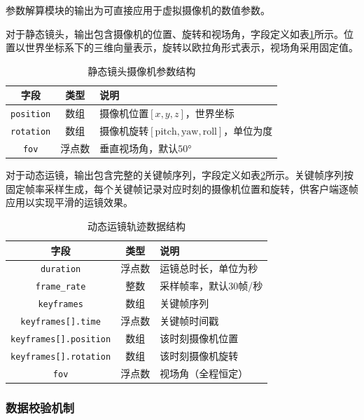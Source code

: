 参数解算模块的输出为可直接应用于虚拟摄像机的数值参数。

对于静态镜头，输出包含摄像机的位置、旋转和视场角，字段定义如表\ref{tab:static_camera}所示。位置以世界坐标系下的三维向量表示，旋转以欧拉角形式表示，视场角采用固定值。

\begin{table}[htbp]
\centering
\caption{静态镜头摄像机参数结构}
\label{tab:static_camera}
\begin{tabular}{ccp{6.5cm}}
\toprule
字段 & 类型 & 说明 \\
\midrule
\texttt{position} & 数组 & 摄像机位置$[x, y, z]$，世界坐标 \\
\texttt{rotation} & 数组 & 摄像机旋转$[\text{pitch}, \text{yaw}, \text{roll}]$，单位为度 \\
\texttt{fov} & 浮点数 & 垂直视场角，默认$50°$ \\
\bottomrule
\end{tabular}
\end{table}

对于动态运镜，输出包含完整的关键帧序列，字段定义如表\ref{tab:dynamic_trajectory}所示。关键帧序列按固定帧率采样生成，每个关键帧记录对应时刻的摄像机位置和旋转，供客户端逐帧应用以实现平滑的运镜效果。

\begin{table}[htbp]
\centering
\caption{动态运镜轨迹数据结构}
\label{tab:dynamic_trajectory}
\begin{tabular}{ccp{6.5cm}}
\toprule
字段 & 类型 & 说明 \\
\midrule
\texttt{duration} & 浮点数 & 运镜总时长，单位为秒 \\
\texttt{frame\_rate} & 整数 & 采样帧率，默认30帧/秒 \\
\texttt{keyframes} & 数组 & 关键帧序列 \\
\texttt{keyframes[].time} & 浮点数 & 关键帧时间戳 \\
\texttt{keyframes[].position} & 数组 & 该时刻摄像机位置 \\
\texttt{keyframes[].rotation} & 数组 & 该时刻摄像机旋转 \\
\texttt{fov} & 浮点数 & 视场角（全程恒定） \\
\bottomrule
\end{tabular}
\end{table}

\subsubsection{数据校验机制}


